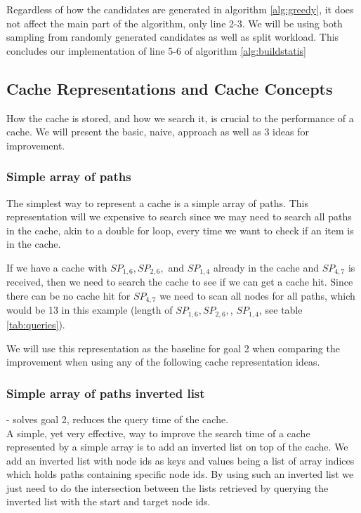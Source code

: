Regardless of how the candidates are generated in algorithm \ref{alg:greedy}, it does not affect the main part of the algorithm, only line 2-3. We will be using both sampling from randomly generated candidates as well as split workload. This concludes our implementation of line 5-6 of algorithm \ref{alg:buildstatis}


\subsection{Cache Representations and Cache Concepts} \label{subsec:cacherepresentatons}
How the cache is stored, and how we search it, is crucial to the performance of a cache. We will present the basic, naive, approach as well as 3 ideas for improvement.
% 
\subsubsection{Simple array of paths}%
The simplest way to represent a cache is a simple array of paths. This representation will we expensive to search since we may need to search all paths in the cache, akin to a double for loop, every time we want to check if an item is in the cache.

If we have a cache with $SP_{1,6},SP_{2,6},$ and $SP_{1,4}$ already in the cache and $SP_{4,7}$ is received, then we need to search the cache to see if we can get a cache hit. Since there can be no cache hit for $SP_{4,7}$ we need to scan all nodes for all paths, which would be 13 in this example (length of $SP_{1,6},SP_{2,6},$, $SP_{1,4}$, see table \ref{tab:queries}).

We will use this representation as the baseline for goal 2 when comparing the improvement when using any of the following cache representation ideas.

\subsubsection{Simple array of paths inverted list} - solves goal 2, reduces the query time of the cache.\\
A simple, yet very effective, way to improve the search time of a cache represented by a simple array is to add an inverted list on top of the cache. We add an inverted list with node ids as keys and values being a list of array indices which holds paths containing specific node ids. By using such an inverted list we just need to do the intersection between the lists retrieved by querying the inverted list with the start and target node ids. 


